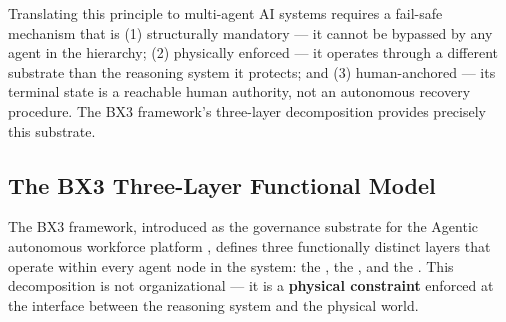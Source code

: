 Translating this principle to multi-agent AI systems requires a fail-safe mechanism that is (1) structurally mandatory — it cannot be bypassed by any agent in the hierarchy; (2) physically enforced — it operates through a different substrate than the reasoning system it protects; and (3) human-anchored — its terminal state is a reachable human authority, not an autonomous recovery procedure. The BX3 framework's three-layer decomposition \cite{tristr81} provides precisely this substrate.

\subsection{The BX3 Three-Layer Functional Model}

The BX3 framework, introduced as the governance substrate for the Agentic autonomous workforce platform \cite{bansal2019}, defines three functionally distinct layers that operate within every agent node in the system: the \purpose, the \bounds, and the \fact. This decomposition is not organizational — it is a \textbf{physical constraint} enforced at the interface between the reasoning system and the physical world.

